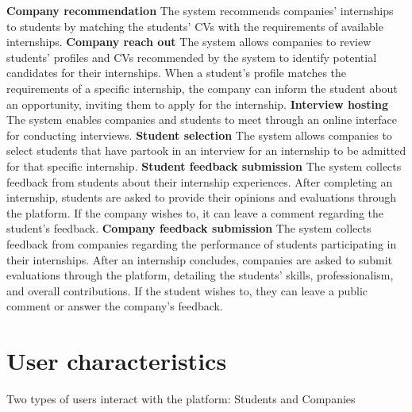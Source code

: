 \textbf{Company recommendation}\newline
The system recommends companies' internships to students by matching the students' CVs with the requirements of available internships. 
\newline
\newline
\textbf{Company reach out}\newline
The system allows companies to review students' profiles and CVs recommended by the system to identify potential candidates for their internships. When a student's profile matches the requirements of a specific internship, the company can inform the student about an opportunity, inviting them to apply for the internship.
\newline
\newline
\textbf{Interview hosting}\newline
The system enables companies and students to meet through an online interface for conducting interviews.
\newline
\newline
\textbf{Student selection}\newline
The system allows companies to select students that have partook in an interview for an internship to be admitted for that specific internship.
\newline
\newline
\textbf{Student feedback submission}\newline
The system collects feedback from students about their internship experiences. After completing an internship, students are asked to provide their opinions and evaluations through the platform. If the company wishes to, it can leave a comment regarding the student's feedback.
\newline
\newline
\textbf{Company feedback submission}\newline
The system collects feedback from companies regarding the performance of students participating in their internships. After an internship concludes, companies are asked to submit evaluations through the platform, detailing the students' skills, professionalism, and overall contributions. If the student wishes to, they can leave a public comment or answer the company's feedback.
\newline
\newline

\section{User characteristics }
Two types of users interact with the platform: Students and Companies
